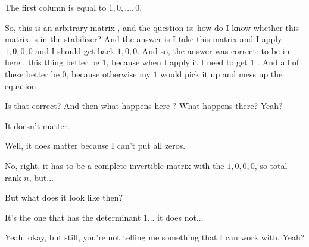 \begin{student}
The first column is equal to $1, 0, \dots, 0$.
\end{student}

\begin{speech}[01:16:14 - 01:16:48]
So, this is an arbitrary matrix , and the question is: how do I know whether this matrix is in the stabilizer? And the answer is I take this matrix and I apply $1, 0, 0, 0$ and I should get back $1, 0, 0$. And so, the answer was correct: to be in here , this thing better be $1$, because when I apply it I need to get $1$ . And all of these better be $0$, because otherwise my $1$ would pick it up and mess up the equation .

Is that correct? And then what happens here ? What happens there? Yeah?
\end{speech}

\begin{student}
It doesn't matter.
\end{student}

\begin{speech}[01:16:51 - 01:16:54]
Well, it does matter because I can't put all zeros.
\end{speech}

\begin{student}
No, right, it has to be a complete invertible matrix with the $1, 0, 0, 0$, so total rank $n$, but...
\end{student}

\begin{speech}[01:17:01 - 01:17:04]
But what does it look like then?
\end{speech}

\begin{student}
It's the one that has the determinant $1$... it does not...
\end{student}

\begin{speech}[01:17:08 - 01:17:12]
Yeah, okay, but still, you're not telling me something that I can work with. Yeah?
\end{speech}

